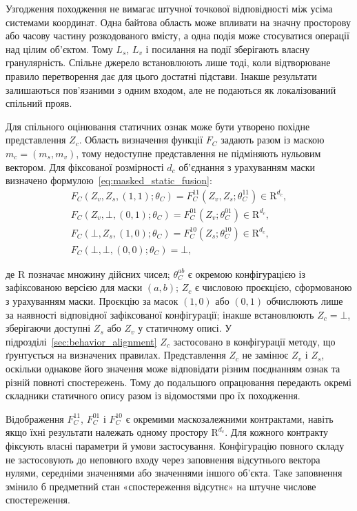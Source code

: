 Узгодження походження не вимагає штучної точкової відповідності між усіма системами координат. Одна байтова область може впливати на значну просторову або часову частину розкодованого вмісту, а одна подія може стосуватися операції над цілим об’єктом. Тому $L_s$, $L_v$ і посилання на події зберігають власну гранулярність. Спільне джерело встановлюють лише тоді, коли відтворюване правило перетворення дає для цього достатні підстави. Інакше результати залишаються пов’язаними з одним входом, але не подаються як локалізований спільний прояв.

Для спільного оцінювання статичних ознак може бути утворено похідне представлення $Z_c$. Область визначення функції $F_C$ задають разом із маскою $m_c=(m_s,m_v)$, тому недоступне представлення не підміняють нульовим вектором. Для фіксованої розмірності $d_c$ об’єднання з урахуванням маски визначено формулою~\eqref{eq:masked_static_fusion}:
\begin{equation}
\begin{gathered}
F_C(Z_v,Z_s,(1,1);\theta_C)=F_C^{11}(Z_v,Z_s;\theta_C^{11})\in\mathrm R^{d_c},\\
F_C(Z_v,\bot,(0,1);\theta_C)=F_C^{01}(Z_v;\theta_C^{01})\in\mathrm R^{d_c},\\
F_C(\bot,Z_s,(1,0);\theta_C)=F_C^{10}(Z_s;\theta_C^{10})\in\mathrm R^{d_c},\\
F_C(\bot,\bot,(0,0);\theta_C)=\bot,
\end{gathered}
\label{eq:masked_static_fusion}
\end{equation}

де $\mathrm R$ позначає множину дійсних чисел; $\theta_C^{ab}$ є окремою конфігурацією із зафіксованою версією для маски $(a,b)$; $Z_c$ є числовою проєкцією, сформованою з урахуванням маски. Проєкцію за масок $(1,0)$ або $(0,1)$ обчислюють лише за наявності відповідної зафіксованої конфігурації; інакше встановлюють $Z_c=\bot$, зберігаючи доступні $Z_s$ або $Z_v$ у статичному описі. У підрозділі~\ref{sec:behavior_alignment} $Z_c$ застосовано в конфігурації методу, що ґрунтується на визначених правилах. Представлення $Z_c$ не замінює $Z_v$ і $Z_s$, оскільки однакове його значення може відповідати різним поєднанням ознак та різній повноті спостережень. Тому до подальшого опрацювання передають окремі складники статичного опису разом із відомостями про їх походження.

Відображення $F_C^{11}$, $F_C^{01}$ і $F_C^{10}$ є окремими маскозалежними контрактами, навіть якщо їхні результати належать одному простору $\mathrm R^{d_c}$. Для кожного контракту фіксують власні параметри й умови застосування. Конфігурацію повного складу не застосовують до неповного входу через заповнення відсутнього вектора нулями, середніми значеннями або значеннями іншого об’єкта. Таке заповнення змінило б предметний стан «спостереження відсутнє» на штучне числове спостереження.

